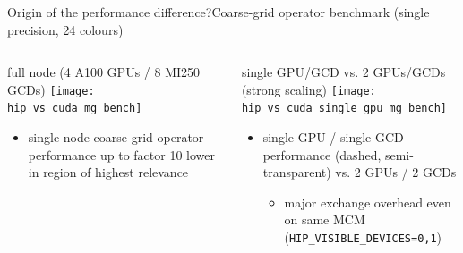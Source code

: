 \documentclass[xcolor={dvipsnames,table}]{beamer}
\begin{document}
\begin{frame}{Origin of the performance difference?}{Coarse-grid operator benchmark (single precision, 24 colours)}
  \begin{columns}
      \begin{hpcablock}{full node (4 A100 GPUs / 8 MI250 GCDs)}
        \texttt{[image: hip\_vs\_cuda\_mg\_bench]} \\
        \begin{itemize}
          \item single node coarse-grid operator performance up to factor 10 lower in region of highest relevance
        \end{itemize}    
      \end{hpcablock}
      \begin{hpcablock}{single GPU/GCD vs. 2 GPUs/GCDs (strong scaling)}
        \texttt{[image: hip\_vs\_cuda\_single\_gpu\_mg\_bench]} \\  
        \begin{itemize}
          \item single GPU / single GCD performance (dashed, semi-transparent) vs. 2 GPUs / 2 GCDs
            \begin{itemize}
              \item major exchange overhead even on same MCM (\texttt{HIP\_VISIBLE\_DEVICES=0,1})
            \end{itemize}
        \end{itemize}    
      \end{hpcablock}  
  \end{columns}
\end{frame}
\end{document}
